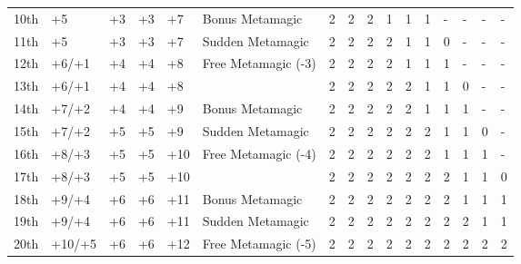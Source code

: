 \begin{table}[htb]
\begin{small}
\begin{tabular}{lp{1.2cm}p{0.7cm}p{0.7cm}p{0.7cm}p{4.7cm}llllllllll}
10th   &+5                 &+3        &+3       &+7        & Bonus Metamagic        &2 &2 &2 &1 &1 &1 &- &- &- &- \\
11th   &+5                 &+3        &+3       &+7        & Sudden Metamagic       &2 &2 &2 &2 &1 &1 &0 &- &- &- \\
12th   &+6/+1              &+4        &+4       &+8        & Free Metamagic (-3)    &2 &2 &2 &2 &1 &1 &1 &- &- &- \\
13th   &+6/+1              &+4        &+4       &+8        &                        &2 &2 &2 &2 &2 &1 &1 &0 &- &- \\
14th   &+7/+2              &+4        &+4       &+9        & Bonus Metamagic        &2 &2 &2 &2 &2 &1 &1 &1 &- &- \\
15th   &+7/+2              &+5        &+5       &+9        & Sudden Metamagic       &2 &2 &2 &2 &2 &2 &1 &1 &0 &- \\
16th   &+8/+3              &+5        &+5       &+10       & Free Metamagic (-4)    &2 &2 &2 &2 &2 &2 &1 &1 &1 &- \\
17th   &+8/+3              &+5        &+5       &+10       &                        &2 &2 &2 &2 &2 &2 &2 &1 &1 &0 \\
18th   &+9/+4              &+6        &+6       &+11       & Bonus Metamagic        &2 &2 &2 &2 &2 &2 &2 &1 &1 &1 \\
19th   &+9/+4              &+6        &+6       &+11       & Sudden Metamagic       &2 &2 &2 &2 &2 &2 &2 &2 &1 &1 \\
20th   &+10/+5             &+6        &+6       &+12       & Free Metamagic (-5)    &2 &2 &2 &2 &2 &2 &2 &2 &2 &2 \\
\end{tabular}
\end{small}
\end{table}  
 

